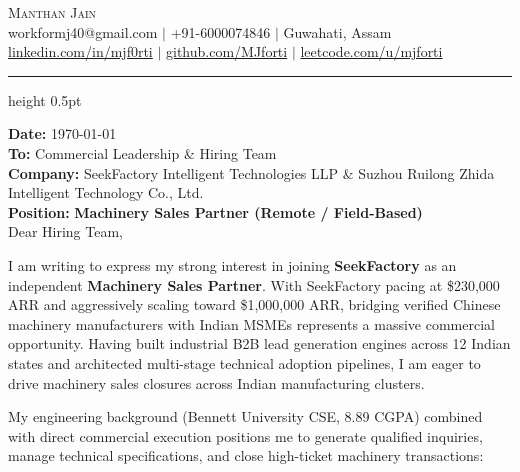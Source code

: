 \documentclass[letterpaper,10pt]{article}
\begin{document}
\begin{center}
  {\Huge \scshape Manthan Jain} \\[6pt]
  \small 
  workformj40@gmail.com \hspace{8pt}$|$\hspace{8pt} +91-6000074846 \hspace{8pt}$|$\hspace{8pt} Guwahati, Assam \\[3pt]
  \href{https://www.linkedin.com/in/mjf0rti}{linkedin.com/in/mjf0rti} \hspace{8pt}$|$\hspace{8pt} \href{https://github.com/MJforti}{github.com/MJforti} \hspace{8pt}$|$\hspace{8pt} \href{https://leetcode.com/u/mjforti_/}{leetcode.com/u/mjforti}
\end{center}

\vspace{-6pt}
\hrule height 0.5pt
\vspace{8pt}

\small
\textbf{Date:} \today \\[3pt]
\textbf{To:} Commercial Leadership \& Hiring Team \\
\textbf{Company:} SeekFactory Intelligent Technologies LLP \& Suzhou Ruilong Zhida Intelligent Technology Co., Ltd. \\
\textbf{Position:} \textbf{Machinery Sales Partner (Remote / Field-Based)} \\[6pt]

Dear Hiring Team,

\vspace{3pt}
I am writing to express my strong interest in joining \textbf{SeekFactory} as an independent \textbf{Machinery Sales Partner}. With SeekFactory pacing at \$230,000 ARR and aggressively scaling toward \$1,000,000 ARR, bridging verified Chinese machinery manufacturers with Indian MSMEs represents a massive commercial opportunity. Having built industrial B2B lead generation engines across 12 Indian states and architected multi-stage technical adoption pipelines, I am eager to drive machinery sales closures across Indian manufacturing clusters.

My engineering background (Bennett University CSE, 8.89 CGPA) combined with direct commercial execution positions me to generate qualified inquiries, manage technical specifications, and close high-ticket machinery transactions:
\end{document}
